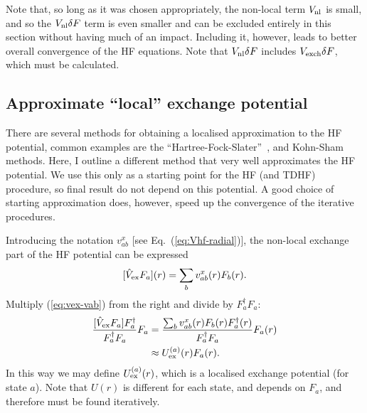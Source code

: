 \documentclass[10pt,twocolumn,a4paper]{article}%
\newcommand{\be}{\begin{equation}}
\newcommand{\ee}{\end{equation}}
\begin{document}
Note that, so long as it was chosen appropriately, the non-local term $V_{\rm nl}$ is small, and so the $V_{\rm nl}\delta F$ term is even smaller and can be excluded entirely in this section without having much of an impact.
Including it, however, leads to better overall convergence of the HF equations.
Note that $V_{\rm nl} \delta F$ includes $V_{\rm exch} \delta F$, which must be calculated.




\subsection{Approximate ``local'' exchange potential}\label{sec:hf-approx}


There are several methods for obtaining a localised approximation to the HF potential, common  examples are the ``Hartree-Fock-Slater''~\cite{Slater1951}, and Kohn-Sham methods.
%
Here, I outline a different method that very well approximates the HF potential.
We use this only as a starting point for the HF (and TDHF) procedure, so final result do not depend on this potential.
A good choice of starting approximation does, however, speed up the convergence of the iterative procedures.

Introducing the notation $v^x_{ab}$ [see Eq.~(\ref{eq:Vhf-radial})], the non-local exchange part of the HF potential can be expressed
\be\label{eq:vex-vab}
 [\hat V_{\rm ex}F_a](r) = \sum_b v^x_{ab}(r) F_b(r).
\ee
Multiply (\ref{eq:vex-vab}) from the right and divide  by $ F_a^\dag F_a$:
\begin{align}
 \frac{[\hat V_{\rm ex}F_a] F_a^\dag }{F_a^\dag F_a} F_a
&= \frac{\sum_b v^x_{ab}(r) F_b(r)F_a^\dag(r) }{F_a^\dag F_a} F_a(r)\\
&\approx U^{(a)}_{\rm ex}(r)F_a(r).
\end{align}
In this way we may define $U^{(a)}_{\rm ex}(r)$, which is a localised exchange potential (for state $a$).
Note that $U(r)$ is different for each state, and depends on $F_a$, and therefore must be found iteratively.
\end{document}
